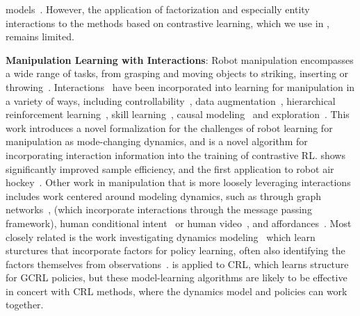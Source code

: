 models~\citep{farebrother2026compositional}. However, the application of factorization and especially entity interactions to the methods based on contrastive learning, which we use in \methodshort{}, remains limited. 

\textbf{Manipulation Learning with Interactions}: Robot manipulation encompasses a wide range of tasks, from grasping and moving objects to striking, inserting or throwing~\citep{han2023survey}. Interactions~\citep{chuck2024automated} have been incorporated into learning for manipulation in a variety of ways, including controllability~\citep{seitzer2021causal}, data augmentation~\citep{pitis2020counterfactual,pitis2022mocoda}, hierarchical reinforcement learning~\citep {chuck2020hypothesis,chuck2023granger,wang2024skild}, skill learning~\citep{hu2024disentangled,rodriguez2025pixels,hosseini2026susd}, causal modeling~\citep{lee2023scale,biswas2024gaze} and exploration~\citep{wang2023elden}. This work introduces a novel formalization for the challenges of robot learning for manipulation as mode-changing dynamics, and \methodshort{} is a novel algorithm for incorporating interaction information into the training of contrastive RL. \methodshort{} shows significantly improved sample efficiency, and the first application to robot air hockey~\citep{chuck2024air}. Other work in manipulation that is more loosely leveraging interactions includes work centered around modeling dynamics, such as through graph networks~\citep{sieb2020graph,huang2023planning,lin2022efficient,zhang2025particle,huangrobocraft,kedia2024interact}, (which incorporate interactions through the message passing framework), human conditional intent~\citep{zhang2024adaptigraph} or human video~\citep{singh2025hand,zhu2026vision}, and affordances~\citep{khazatsky2021can,girgin2024multiobject}. Most closely related is the work investigating dynamics modeling~\citep{haramati2026hierarchical,wang2026factored} which learn sturctures that incorporate factors for policy learning, often also identifying the factors themselves from observations~\citep{daniel2026latent, qi2025ec}. \methodshort{} is applied to CRL, which learns structure for GCRL policies, but these model-learning algorithms are likely to be effective in concert with CRL methods, where the dynamics model and policies can work together.